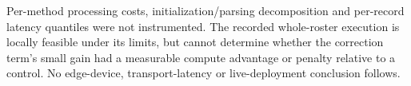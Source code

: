 \begin{table}[htbp]\centering\small
\caption{Whole-phase resources, including source checks, parsing and output work. These are not isolated inference measurements.}\label{tab:resources}

\end{table}

Per-method processing costs, initialization/parsing decomposition and per-record latency quantiles were not instrumented. The recorded whole-roster execution is locally feasible under its limits, but cannot determine whether the correction term's small gain had a measurable compute advantage or penalty relative to a control. No edge-device, transport-latency or live-deployment conclusion follows.
